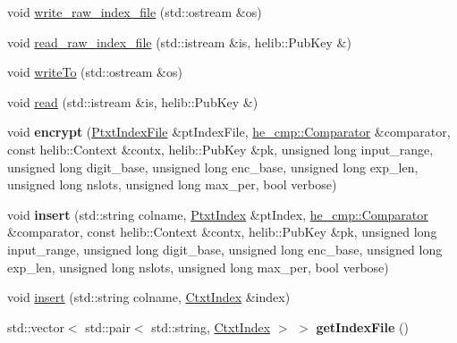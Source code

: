 \begin{DoxyCompactItemize}
\item 
void \hyperlink{classHDB__supergate___1_1CtxtIndexFile_a056ff9214e26089299c1873ac01cca77}{write\+\_\+raw\+\_\+index\+\_\+file} (std\+::ostream \&os)
\item 
void \hyperlink{classHDB__supergate___1_1CtxtIndexFile_ae29e9a0c167adc7835adc20769f14a99}{read\+\_\+raw\+\_\+index\+\_\+file} (std\+::istream \&is, helib\+::\+Pub\+Key \&)
\item 
void \hyperlink{classHDB__supergate___1_1CtxtIndexFile_a77cbe7cc6a4ebb0831786a2fa4864857}{write\+To} (std\+::ostream \&os)
\item 
void \hyperlink{classHDB__supergate___1_1CtxtIndexFile_aadb472b58b9f21f2220f1150d05270af}{read} (std\+::istream \&is, helib\+::\+Pub\+Key \&)
\item 
\mbox{\label{classHDB__supergate___1_1CtxtIndexFile_a36979271995370a2e2376877cff9cf29}} 
void {\bfseries encrypt} (\hyperlink{classHDB__supergate___1_1PtxtIndexFile}{Ptxt\+Index\+File} \&pt\+Index\+File, \hyperlink{classhe__cmp_1_1Comparator}{he\+\_\+cmp\+::\+Comparator} \&comparator, const helib\+::\+Context \&contx, helib\+::\+Pub\+Key \&pk, unsigned long input\+\_\+range, unsigned long digit\+\_\+base, unsigned long enc\+\_\+base, unsigned long exp\+\_\+len, unsigned long nslots, unsigned long max\+\_\+per, bool verbose)
\item 
\mbox{\label{classHDB__supergate___1_1CtxtIndexFile_af5316d579090faa7872b4f00b5b55bdf}} 
void {\bfseries insert} (std\+::string colname, \hyperlink{classHDB__supergate___1_1PtxtIndex}{Ptxt\+Index} \&pt\+Index, \hyperlink{classhe__cmp_1_1Comparator}{he\+\_\+cmp\+::\+Comparator} \&comparator, const helib\+::\+Context \&contx, helib\+::\+Pub\+Key \&pk, unsigned long input\+\_\+range, unsigned long digit\+\_\+base, unsigned long enc\+\_\+base, unsigned long exp\+\_\+len, unsigned long nslots, unsigned long max\+\_\+per, bool verbose)
\item 
void \hyperlink{classHDB__supergate___1_1CtxtIndexFile_ab581d8e3c893b29a80b18413b1c45412}{insert} (std\+::string colname, \hyperlink{classHDB__supergate___1_1CtxtIndex}{Ctxt\+Index} \&index)
\item 
\mbox{\label{classHDB__supergate___1_1CtxtIndexFile_a8bb51b5beedb6d43770a6d248b61e2d3}} 
std\+::vector$<$ std\+::pair$<$ std\+::string, \hyperlink{classHDB__supergate___1_1CtxtIndex}{Ctxt\+Index} $>$ $>$ {\bfseries get\+Index\+File} ()

\end{DoxyCompactItemize}
